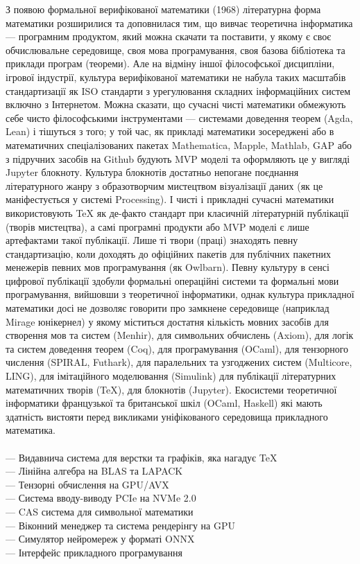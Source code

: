 З появою формальної верифікованої математики (1968) літературна
форма математики розширилися та доповнилася тим, що вивчає
теоретична інформатика --- програмним продуктом, який можна
скачати та поставити, у якому є своє обчислювальне середовище,
своя мова програмування, своя базова бібліотека та приклади
програм (теореми). Але на відміну іншої філософської
дисципліни, ігрової індустрії, культура верифікованої
математики не набула таких масштабів стандартизації як
ISO стандарти з урегулювання складних інформаційних систем
включно з Інтернетом. Можна сказати, що сучасні чисті математики
обмежують себе чисто філософськими інструментами --- системами
доведення теорем (Agda, Lean) і тішуться з того; у той час,
як прикладі математики зосереджені або в математичних
спеціалізованих пакетах Mathematica, Mapple, Mathlab,
GAP або з підручних засобів на Github будують MVP моделі
та оформляють це у вигляді Jupyter блокноту. Культура
блокнотів достатньо непогане поєднання літературного жанру
з образотворчим мистецтвом візуалізації даних (як це маніфестується
у системі Processing). І чисті і прикладні сучасні математики
використовують TeX як де-факто стандарт при класичній літературній
публікації (творів мистецтва), а самі програмні продукти або MVP
моделі є лише артефактами такої публікації. Лише ті твори (праці)
знаходять певну стандартизацію, коли доходять до офіційних пакетів
для публічних пакетних менежерів певних мов
програмування (як Owlbarn). Певну культуру в
сенсі цифрової публікації здобули формальні операційні
системи та формальні мови програмування, вийшовши з теоретичної
інформатики, однак культура прикладної математики досі не
дозволяє говорити про замкнене середовище (наприклад Mirage
юнікернел) у якому міститься достатня кількість мовних засобів
для створення мов та систем (Menhir), для символьних
обчислень (Axiom), для логік та систем доведення теорем (Coq),
для програмування (OCaml), для тензорного числення (SPIRAL,
Futhark), для паралельних та узгоджених систем (Multicore,
LING), для імітаційного моделювання (Simulink) для публікації
літературних математичних творів (TeX), для блокнотів (Jupyter).
Екосистеми теоретичної інформатики французької та британської
шкіл (OCaml, Haskell) які мають здатність вистояти перед
викликами уніфікованого середовища прикладного математика.
\\
\\
\noindent--- Видавнича система для верстки та графіків, яка нагадує TeX\\
--- Лінійна алгебра на BLAS та LAPACK\\
--- Тензорні обчислення на GPU/AVX\\
--- Система вводу-виводу PCIe на NVMe 2.0\\
--- CAS система для символьної математики\\
--- Віконний менеджер та система рендерінгу на GPU\\
--- Симулятор нейромереж у форматі ONNX\\
--- Інтерфейс прикладного програмування\\

